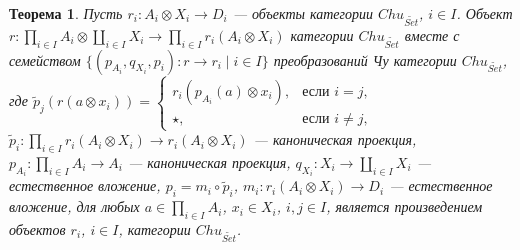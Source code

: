 \documentclass[a4paper,12pt]{article}
\newtheorem{theorem}{Теорема}
\begin{document}
\begin{theorem}\label{product-gact}
    Пусть $r_i: A_i \otimes X_i \to D_i$ --- объекты категории $Chu_{\widetilde{Set}}$, $i \in I$. Объект $r: \prod_{i \in I} A_i \otimes \coprod_{i \in I} X_i \to \prod_{i \in I} r_i(A_i \otimes X_i)$ категории $Chu_{\widetilde{Set}}$ вместе с семейством $\{(p_{A_i},q_{X_i},p_i): r \to r_i \mid i \in I\}$ преобразований Чу категории $Chu_{\widetilde{Set}}$, где $\tilde{p}_j(r(a \otimes x_i)) = 
    \begin{cases}
        r_i(p_{A_i}(a) \otimes x_i),& \text{если } i = j,\\
        \star,& \text{если } i \ne j,
    \end{cases}$
    $\tilde{p}_i: \prod_{i \in I} r_i(A_i \otimes X_i) \to r_i(A_i \otimes X_i)$ --- каноническая проекция, $p_{A_i}: \prod_{i \in I} A_i \to A_i$ --- каноническая проекция, $q_{X_i}: X_i \to \coprod_{i \in I} X_i$ --- естественное вложение, $p_i = m_i \circ \tilde{p}_i$, $m_i: r_i(A_i \otimes X_i) \to D_i$ --- естественное вложение, для любых $a \in \prod_{i \in I} A_i$, $x_i \in X_i$, $i,j \in I$, является произведением объектов $r_i$, $i \in I$, категории $Chu_{\widetilde{Set}}$.
\end{theorem}
\end{document}
